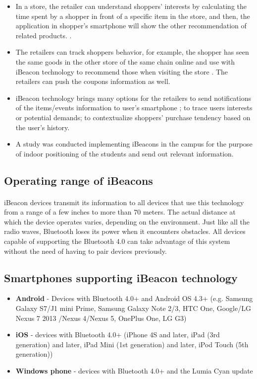 \documentclass[12pt]{article}
\begin{document}
\begin{itemize}
	\item In a store, the retailer can understand shoppers’ interests by calculating the time spent by a shopper in front of a specific item in the store, and then, the application in shopper’s smartphone will show the other recommendation of related products. \cite{beacons}.

\item The retailers can track shoppers behavior, for example, the shopper has seen the same goods in the other store of the same chain online and use with iBeacon technology to recommend those when visiting the store \cite{beacons}. The retailers can push the coupons information as well.

\item iBeacon technology brings many options for the retailers to send notifications of the items/events information to user's smartphone \cite{beacons}; to trace users interests or potential demands; to contextualize shoppers’ purchase tendency based on the user's history.

\item{} A study was conducted implementing iBeacons in the campus for the purpose of indoor positioning of the students and send out relevant information. \cite{campus}

\end{itemize}

\subsection{Operating range of iBeacons}
\paragraph{}iBeacon devices transmit its information to all devices that use this technology from a range of a few inches to more than 70 meters. The actual distance at which the device operates varies, depending on the environment. Just like all the radio waves, Bluetooth loses its power when it encounters obstacles. \cite{demo} All devices capable of supporting the Bluetooth 4.0 can take advantage of this system without the need of having to pair devices previously.

\subsection{Smartphones supporting iBeacon technology}
\begin{itemize}
	\item \textbf{Android} - Devices with Bluetooth 4.0+ and Android OS 4.3+ (e.g. Samsung Galaxy S7/J1 mini Prime, Samsung Galaxy Note 2/3, HTC One, Google/LG Nexus 7 2013 /Nexus 4/Nexus 5, OnePlus One, LG G3)
	\item \textbf{iOS} -  devices with Bluetooth 4.0+ (iPhone 4S and later, iPad (3rd generation) and later, iPad Mini (1st generation) and later, iPod Touch (5th generation))
	\item \textbf{Windows phone} - devices with Bluetooth 4.0+ and the Lumia Cyan update

\end{itemize}
\end{document}

